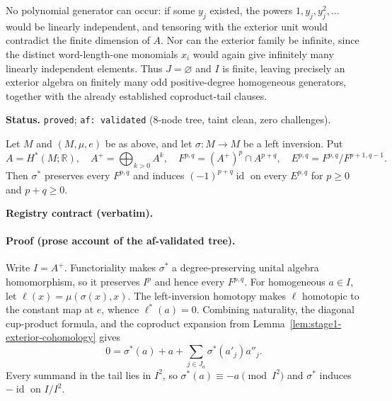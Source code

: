 No polynomial generator can occur: if some $y_j$ existed, the powers
$1,y_j,y_j^2,\ldots$ would be linearly independent, and tensoring with the exterior unit
would contradict the finite dimension of $A$.  Nor can the exterior family be infinite,
since the distinct word-length-one monomials $x_i$ would again give infinitely many
linearly independent elements.  Thus $J=\varnothing$ and $I$ is finite, leaving precisely
an exterior algebra on finitely many odd positive-degree homogeneous generators, together
with the already established coproduct-tail clauses.

\medskip
\noindent\textbf{Status.} \texttt{proved}; \texttt{af: validated} (8-node tree, taint
clean, zero challenges).

\begin{lemma}\label{lem:stage1-left-inversion-associated-graded}
Let $M$ and $(M,\mu,e)$ be as above, and let $\sigma:M\to M$ be a left inversion.  Put
\[
 A=H^*(M;\mathbb R),\quad A^+=\bigoplus_{k>0}A^k,\quad
 F^{p,q}=(A^+)^p\cap A^{p+q},\quad
 E^{p,q}=F^{p,q}/F^{p+1,q-1}.
\]
Then $\sigma^*$ preserves every $F^{p,q}$ and induces
$(-1)^{p+q}\operatorname{id}$ on every $E^{p,q}$ for $p\ge0$ and $p+q\ge0$.
\end{lemma}

\noindent\textbf{Registry contract (verbatim).}

\paragraph{Proof (prose account of the af-validated tree).}
Write $I=A^+$.  Functoriality makes $\sigma^*$ a degree-preserving unital algebra
homomorphism, so it preserves $I^p$ and hence every $F^{p,q}$.  For homogeneous $a\in I$,
let $\ell(x)=\mu(\sigma(x),x)$.  The left-inversion homotopy makes $\ell$ homotopic to the
constant map at $e$, whence $\ell^*(a)=0$.  Combining naturality, the diagonal cup-product
formula, and the coproduct expansion from Lemma~\ref{lem:stage1-exterior-cohomology} gives
\[
 0=\sigma^*(a)+a+\sum_{j\in J_a}\sigma^*(a'_j)a''_j.
\]
Every summand in the tail lies in $I^2$, so $\sigma^*(a)\equiv-a\pmod{I^2}$ and
$\sigma^*$ induces $-\operatorname{id}$ on $I/I^2$.


